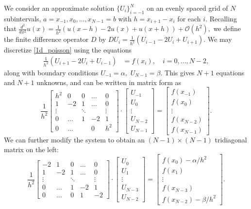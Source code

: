 We consider an approximate solution $\{U_i\}_{i=-1}^N$ on an evenly spaced grid of $N$ subintervals, $a = x_{-1}, x_0, \ldots, x_{N-1} = b$ with $h = x_{i+1}-x_i$ for each $i.$
Recalling that $\frac{d^2}{dx^2}u(x) = \frac{1}{h^2}\left(u(x-h) -2u(x) + u(x+h)\right) + \mathcal{O}(h^2),$ we define the finite difference operator $D$ by  $DU_i = \frac{1}{h^2}\left(U_{i-1} -2U_i + U_{i+1}\right).$
We may discretize \eqref{1d_poisson} using the equations 
\begin{align*}
	\frac{1}{h^2} (U_{i+1}- 2U_i + U_{i-1})  &= f(x_i), \quad i = 0, \ldots, N-2,
\end{align*}
along with boundary conditions $U_{-1} = \alpha,$ $U_{N-1} = \beta.$ This gives $N+1$ equations and $N+1$ unknowns, and can be written in matrix form as 
\[
\frac{1}{h^2} \begin{bmatrix}h^2 & 0 &0&\hdots &0 \\ 1 &-2 & 1 &\hdots &0\\ \vdots &  & \ddots & &\vdots \\
0 & \hdots & 1 & -2 & 1 \\ 0 & \hdots & & 0 & h^2
\end{bmatrix} \cdot \begin{bmatrix}U_{-1}\\U_0\\ \vdots \\U_{N-2} \\U_{N-1}\end{bmatrix} = \begin{bmatrix}f(x_{-1})\\f(x_0)\\ \vdots \\ f(x_{N-2}) \\ f(x_{N-1}) \end{bmatrix}.
\]
We can further modify the system to obtain an $(N-1)\times (N-1)$ tridiagonal matrix on the left: 
\[
\frac{1}{h^2} \begin{bmatrix}-2 & 1 &0 & \hdots &0\\ 1 &-2 & 1 &\hdots &0\\ \vdots &  & \ddots & &\vdots \\ 0 & \hdots & 1 & -2 & 1 \\
0 & \hdots & 0 & 1 & -2 
\end{bmatrix} \cdot \begin{bmatrix}U_0\\U_1\\ \vdots \\U_{N-3}\\U_{N-2}\end{bmatrix} = \begin{bmatrix}f(x_0) -\alpha/h^2 \\f(x_1)\\ \vdots \\ f(x_{N-3})\\ f(x_{N-2})-\beta/h^2 \end{bmatrix}.
\]

